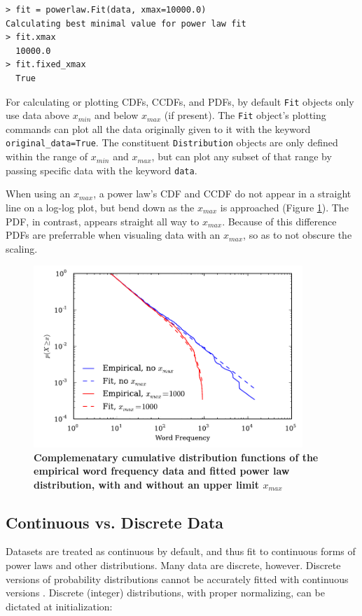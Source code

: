 \documentclass[10pt]{article}
\begin{document}
\begin{verbatim}
> fit = powerlaw.Fit(data, xmax=10000.0)
Calculating best minimal value for power law fit
> fit.xmax
  10000.0
> fit.fixed_xmax
  True
\end{verbatim}

For calculating or plotting CDFs, CCDFs, and PDFs, by default \verb"Fit" objects only use data above $x_{min}$ and below $x_{max}$ (if present). The \verb$Fit$ object's plotting commands can plot all the data originally given to it with the keyword \verb$original_data=True$. The constituent \verb$Distribution$ objects are only defined within the range of $x_{min}$ and $x_{max}$, but can plot any subset of that range by passing specific data with the keyword \verb$data$. 

When using an $x_{max}$, a power law's CDF and CCDF do not appear in a straight line on a log-log plot, but bend down as the $x_{max}$ is approached (Figure \ref{CCDFmax}). The PDF, in contrast, appears straight all way to $x_{max}$. Because of this difference PDFs are preferrable when visualing data with an $x_{max}$, so as to not obscure the scaling.

\begin{figure}[!ht]
\begin{center}
\includegraphics[width=4in]{FigCCDFmax.pdf}
\end{center}
\caption{
{\bf Complemenatary cumulative distribution functions of the empirical word frequency data and fitted power law distribution, with and without an upper limit $x_{max}$}
}
\label{CCDFmax}
\end{figure}

\subsection*{Continuous vs. Discrete Data}
Datasets are treated as continuous by default, and thus fit to continuous forms of power laws and other distributions. Many data are discrete, however. Discrete versions of probability distributions cannot be accurately fitted with continuous versions \cite{Clauset2009}. Discrete (integer) distributions, with proper normalizing, can be dictated at initialization:
\end{document}
